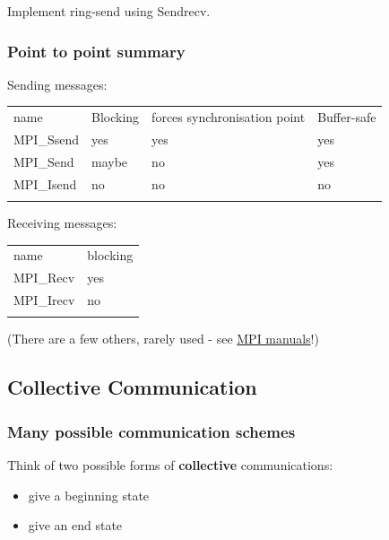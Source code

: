 Implement ring-send using Sendrecv.

\subsubsection{Point to point summary}\label{point-to-point-summary}

Sending messages:

\begin{longtable}[c]{@{}llll@{}}
\toprule\addlinespace
name & Blocking & forces synchronisation point & Buffer-safe
\\\addlinespace
\midrule\endhead
MPI\_Ssend & yes & yes & yes
\\\addlinespace
MPI\_Send & maybe & no & yes
\\\addlinespace
MPI\_Isend & no & no & no
\\\addlinespace
\bottomrule
\end{longtable}

Receiving messages:

\begin{longtable}[c]{@{}ll@{}}
\toprule\addlinespace
name & blocking
\\\addlinespace
\midrule\endhead
MPI\_Recv & yes
\\\addlinespace
MPI\_Irecv & no
\\\addlinespace
\bottomrule
\end{longtable}

(There are a few others, rarely used - see
\href{https://www.open-mpi.org/doc/v3.0/}{MPI manuals}!)

\subsection{Collective Communication}\label{collective-communication}

\subsubsection{Many possible communication
schemes}\label{many-possible-communication-schemes}

Think of two possible forms of \textbf{collective} communications:

\begin{itemize}
\itemsep1pt\parskip0pt
\item
  give a beginning state
\item
  give an end state
\end{itemize}

